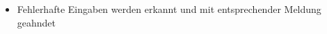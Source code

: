 \documentclass[]{book}
\begin{document}
\begin{itemize}
\item Fehlerhafte Eingaben werden erkannt und mit entsprechender Meldung geahndet
\end{itemize}
\end{document}
